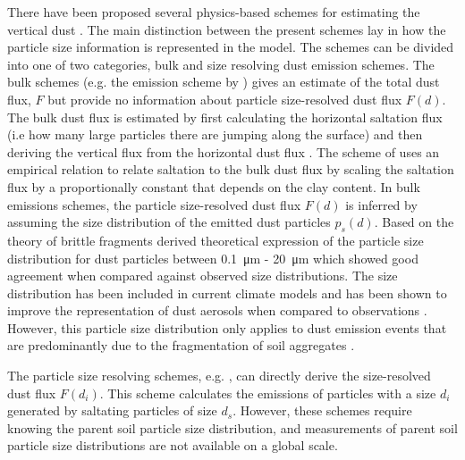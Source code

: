There have been proposed several physics-based schemes for estimating the vertical dust \parencite{MB95_dust_emission,alfaro2001modeling,shao2004simplification}. 
The main distinction between the present schemes lay in how the particle size information is represented in the model. The schemes can be divided into one of two categories, bulk and size resolving dust emission schemes.
The bulk schemes (e.g. the emission scheme by \parencite{MB95_dust_emission}) gives an estimate of the total dust flux, $F$ but provide no information about particle size-resolved dust flux $F(d)$. The bulk dust flux is estimated by first calculating the horizontal saltation flux (i.e how many large particles there are jumping along the surface) and then deriving the vertical flux from the horizontal dust flux \parencite{tegen2014numerical}.
The scheme of \textcite{MB95_dust_emission} uses an empirical relation to relate saltation to the bulk dust flux by scaling the saltation flux by a proportionally constant that depends on the clay content. In bulk emissions schemes, the particle size-resolved dust flux $F(d)$ is inferred by assuming the size distribution of the emitted dust particles $p_s(d)$.
Based on the theory of brittle fragments \textcite{kok_scaling_2011} derived theoretical expression of the particle size distribution for dust particles between \SI{0.1}{\micro\metre} - \SI{20}{\micro\metre} which showed good agreement when compared against observed size distributions. 
The \textcite{kok_scaling_2011} size distribution has been included in current climate models and has been shown to improve the representation of dust aerosols when compared to observations \parencite{johnson2012global}.
However, this particle size distribution only applies to dust emission events that are predominantly due to the fragmentation of soil aggregates \parencite{kok2012physics}.


The particle size resolving schemes, e.g. \textcite{shao2004simplification}, can directly derive the size-resolved dust flux $F(d_i)$. This scheme calculates the emissions of particles with a size $d_i$ generated by saltating particles of size $d_s$. However, these schemes require knowing the parent soil particle size distribution, and measurements of parent soil particle size distributions are not available on a global scale.

